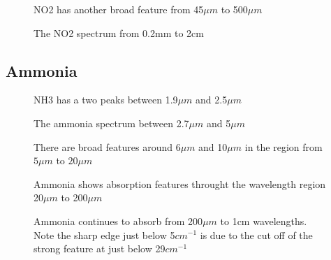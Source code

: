 \documentclass[12pt]{article}
\begin{document}
\vspace*{11.5cm}
\begin{figure}[htb]
\caption{NO2 has another broad feature from 45$\mu m$ to 500$\mu m$}
\end{figure}
\newpage

\vspace*{11.5cm}
\begin{figure}[htb]
\caption{The NO2 spectrum from 0.2mm to 2cm}
\end{figure}
\newpage


\subsection{Ammonia}

\vspace*{13.5cm}
\begin{figure}[htb]
\caption{NH3 has a two peaks between 1.9$\mu m$ and 2.5$\mu m$}
\end{figure}
\newpage


\vspace*{11.5cm}
\begin{figure}[htb]
\caption{The ammonia spectrum between  2.7$\mu m$ and 5$\mu m$}
\end{figure}
\newpage

\vspace*{11.5cm}
\begin{figure}[htb]
\caption{There are broad features around   6$\mu m$ and 10$\mu m$ in the region
from $5 \mu m$ to $20 \mu m$}
\end{figure}
\newpage

\vspace*{11.5cm}
\begin{figure}[htb]
\caption{Ammonia shows absorption features throught the wavelength region 20$\mu m$ to 200$\mu m$}
\end{figure}
\newpage

\vspace*{11.5cm}
\begin{figure}[htb]
\caption{Ammonia continues to absorb from 200$\mu m$ to 1cm wavelengths. Note the sharp edge
 just below 5$cm^{-1}$ is due to the cut off of the strong feature at just below 29$cm^{-1}$}
\end{figure}
\newpage
\end{document}
